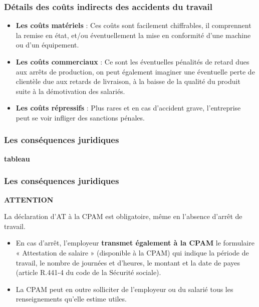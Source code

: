 \documentclass{beamer}
\begin{document}
\begin{frame}
\frametitle{Détails des coûts indirects des accidents du travail}

\begin{itemize}
\item \textbf{Les coûts matériels} : Ces coûts sont facilement chiffrables, il comprennent la remise en état, et/ou éventuellement la mise en conformité d’une machine ou d’un équipement.

\item \textbf{Les coûts commerciaux} : Ce sont les éventuelles pénalités de retard dues aux arrêts de production, on peut également imaginer une éventuelle perte de clientèle due aux retards de livraison, à la baisse de la qualité du produit suite à la démotivation des salariés.

\item \textbf{Les coûts répressifs} : Plus rares et en cas d’accident grave, l’entreprise peut se voir infliger des sanctions pénales.
\end{itemize}
\end{frame}

\begin{frame}
\frametitle{Les conséquences juridiques}

\textbf{tableau}
\end{frame}

\begin{frame}
\frametitle{Les conséquences juridiques }

\textbf{ATTENTION}

La déclaration d’AT à la CPAM est obligatoire, même en l’absence d’arrêt de travail. 
\begin{itemize}
\item En cas d’arrêt, l’employeur \textbf{transmet également à la CPAM} le formulaire « Attestation de salaire » (disponible à la CPAM) qui indique la période de travail, le nombre de journées et d’heures, le montant et la date de payes (article R.441-4 du code de la Sécurité sociale).
\item La CPAM peut en outre solliciter de l’employeur ou du salarié tous les renseignements qu’elle estime utiles.
\end{itemize}
\end{frame}
\end{document}
